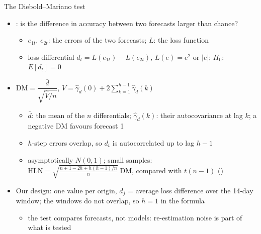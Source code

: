 \begin{frame}{The Diebold--Mariano test}
\itemsize{\footnotesize}
\begin{itemize}
    \item {}: is the difference in accuracy between two forecasts larger than chance?
    \begin{itemize}
        \item $e_{1t}$, $e_{2t}$: the errors of the two forecasts; $L$: the loss function
        \item loss differential $d_t = L(e_{1t}) - L(e_{2t})$, $L(e) = e^2$ or $|e|$; $H_0$: $E[d_t] = 0$
    \end{itemize}
    \item $\mathrm{DM} = \dfrac{\bar d}{\sqrt{\hat V/n}}$, $\hat V = \hat\gamma_d(0) + 2\sum_{k=1}^{h-1}\hat\gamma_d(k)$
    \begin{itemize}
        \item $\bar d$: the mean of the $n$ differentials; $\hat\gamma_d(k)$: their autocovariance at lag $k$; a negative DM favours forecast 1
        \item $h$-step errors overlap, so $d_t$ is autocorrelated up to lag $h - 1$
        \item asymptotically $N(0, 1)$; small samples: $\mathrm{HLN} = \sqrt{\frac{n + 1 - 2h + h(h - 1)/n}{n}}\;\mathrm{DM}$, compared with $t(n - 1)$ ()
    \end{itemize}
    \item Our design: one value per origin, $d_j$ = average loss difference over the 14-day window; the windows do not overlap, so $h = 1$ in the formula
    \begin{itemize}
        \item the test compares forecasts, not models: re-estimation noise is part of what is tested
    \end{itemize}
\end{itemize}
\end{frame}

